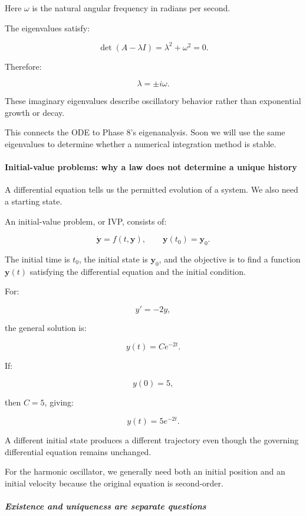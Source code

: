 Here \(\omega\) is the natural angular frequency in radians per second.

The eigenvalues satisfy:

\[
\det(A-\lambda I) = \lambda^2+\omega^2=0.
\]

Therefore:

\[
\lambda=\pm i\omega.
\]

These imaginary eigenvalues describe oscillatory behavior rather than exponential growth or decay.

This connects the ODE to Phase 8's eigenanalysis. Soon we will use the same eigenvalues to determine whether a numerical integration method is stable.

\paragraph{Initial-value problems: why a law does not determine a unique history}\label{initial-value-problems-why-a-law-does-not-determine-a-unique-history}

A differential equation tells us the permitted evolution of a system. We also need a starting state.

An initial-value problem, or IVP, consists of:

\[
\boxed{ \dot{\mathbf y}=f(t,\mathbf y), \qquad \mathbf y(t_0)=\mathbf y_0 }.
\]

The initial time is \(t_0\), the initial state is \(\mathbf y_0\), and the objective is to find a function \(\mathbf y(t)\) satisfying the differential equation and the initial condition.

For:

\[
y'=-2y,
\]

the general solution is:

\[
y(t)=Ce^{-2t}.
\]

If:

\[
y(0)=5,
\]

then \(C=5\), giving:

\[
\boxed{y(t)=5e^{-2t}}.
\]

A different initial state produces a different trajectory even though the governing differential equation remains unchanged.

For the harmonic oscillator, we generally need both an initial position and an initial velocity because the original equation is second-order.

\subparagraph{Existence and uniqueness are separate questions}\label{existence-and-uniqueness-are-separate-questions}

